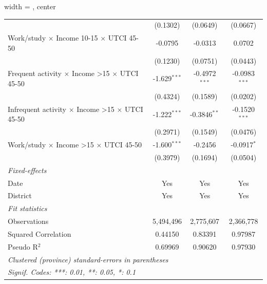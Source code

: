 \begin{table}[htbp]
\begin{adjustbox}{width = \textwidth, center}
\begin{tabular}{lccc}
                                                                         & (0.1302)                  & (0.0649)                & (0.0667)\\   
         Work/study $\times$ Income 10-15 $\times$ UTCI 45-50            & -0.0795                   & -0.0313                 & 0.0702\\   
                                                                         & (0.1230)                  & (0.0751)                & (0.0443)\\   
         Frequent activity $\times$ Income >15 $\times$ UTCI 45-50       & -1.629$^{***}$            & -0.4972$^{***}$         & -0.0983$^{***}$\\   
                                                                         & (0.4324)                  & (0.1589)                & (0.0202)\\   
         Infrequent activity $\times$ Income >15 $\times$ UTCI 45-50     & -1.222$^{***}$            & -0.3846$^{**}$          & -0.1520$^{***}$\\   
                                                                         & (0.2971)                  & (0.1549)                & (0.0476)\\   
         Work/study $\times$ Income >15 $\times$ UTCI 45-50              & -1.600$^{***}$            & -0.2456                 & -0.0917$^{*}$\\   
                                                                         & (0.3979)                  & (0.1694)                & (0.0504)\\   
         \midrule
         \emph{Fixed-effects}\\
         Date                                                            & Yes                       & Yes                     & Yes\\  
         District                                                        & Yes                       & Yes                     & Yes\\  
         \midrule
         \emph{Fit statistics}\\
         Observations                                                    & 5,494,496                 & 2,775,607               & 2,366,778\\  
         Squared Correlation                                             & 0.44150                   & 0.83391                 & 0.97987\\  
         Pseudo R$^2$                                                    & 0.69969                   & 0.90620                 & 0.97930\\  
         \midrule \midrule
         \multicolumn{4}{l}{\emph{Clustered (province) standard-errors in parentheses}}\\
         \multicolumn{4}{l}{\emph{Signif. Codes: ***: 0.01, **: 0.05, *: 0.1}}\\
      \end{tabular}
   \end{adjustbox}
\end{table}



